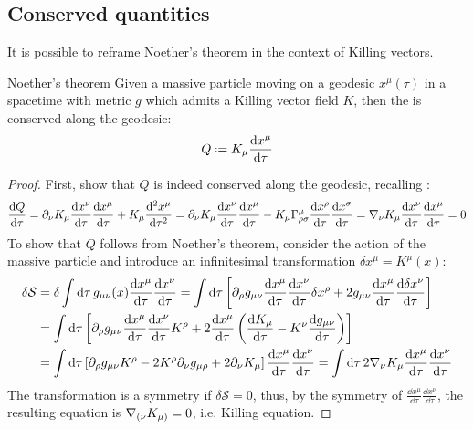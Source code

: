 \subsection{Conserved quantities}

It is possible to reframe Noether's theorem in the context of Killing vectors.

\begin{theorem}{Noether's theorem}{}
  Given a massive particle moving on a geodesic $ x^\mu(\tau) $ in a spacetime with metric $ g $ which admits a Killing vector field $ K $, then the  is conserved along the geodesic:
  \begin{equation}
    Q \defeq K_\mu \frac{\dd x^\mu}{\dd \tau}
  \end{equation}
\end{theorem}

\begin{proofbox}
  \begin{proof}
    First, show that $ Q $ is indeed conserved along the geodesic, recalling :
    \begin{equation*}
      \frac{\mathrm{d} Q}{\mathrm{d} \tau} = \partial_\nu K_\mu \frac{\mathrm{d} x^\nu}{\mathrm{d} \tau} \frac{\mathrm{d} x^\mu}{\mathrm{d} \tau} + K_\mu \frac{\mathrm{d}^2 x^\mu}{\mathrm{d} \tau^2} = \partial_\nu K_\mu \frac{\mathrm{d} x^\nu}{\mathrm{d} \tau} \frac{\mathrm{d} x^\mu}{\mathrm{d} \tau} - K_\mu \Gamma^\mu_{\rho \sigma} \frac{\mathrm{d} x^\rho}{\mathrm{d} \tau} \frac{\mathrm{d} x^\sigma}{\mathrm{d} \tau} = \nabla_\nu K_\mu \frac{\mathrm{d} x^\nu}{\mathrm{d} \tau} \frac{\mathrm{d} x^\mu}{\mathrm{d} \tau} = 0
    \end{equation*}
    To show that $ Q $ follows from Noether's theorem, consider the action of the massive particle and introduce an infinitesimal transformation $ \delta x^\mu = K^\mu (x) $:
    \begin{equation*}
      \begin{split}
        \delta \mathcal{S}
        &= \delta \int \mathrm{d} \tau\, g_{\mu \nu}(x) \frac{\mathrm{d} x^\mu}{\mathrm{d} \tau} \frac{\mathrm{d} x^\nu}{\mathrm{d} \tau} = \int \mathrm{d} \tau \left[ \partial_\rho g_{\mu \nu} \frac{\mathrm{d} x^\mu}{\mathrm{d} \tau} \frac{\mathrm{d} x^\nu}{\mathrm{d} \tau} \delta x^\rho + 2 g_{\mu \nu} \frac{\mathrm{d} x^\mu}{\mathrm{d} \tau} \frac{\mathrm{d} \delta x^\nu}{\mathrm{d} \tau} \right] \\
        &= \int \mathrm{d} \tau \left[ \partial_\rho g_{\mu \nu} \frac{\mathrm{d} x^\mu}{\mathrm{d} \tau} \frac{\mathrm{d} x^\nu}{\mathrm{d} \tau} K^\rho + 2 \frac{\mathrm{d} x^\mu}{\mathrm{d} \tau} \left( \frac{\mathrm{d} K_\mu}{\mathrm{d} \tau} - K^\nu \frac{\mathrm{d} g_{\mu \nu}}{\mathrm{d} \tau} \right) \right] \\
        &= \int \mathrm{d} \tau \left[ \partial_\rho g_{\mu \nu} K^\rho - 2 K^\rho \partial_\nu g_{\mu \rho} + 2 \partial_\nu K_\mu \right] \frac{\mathrm{d} x^\mu}{\mathrm{d} \tau} \frac{\mathrm{d} x^\nu}{\mathrm{d} \tau} = \int \mathrm{d} \tau\, 2 \nabla_\nu K_\mu \frac{\mathrm{d} x^\mu}{\mathrm{d} \tau} \frac{\mathrm{d} x^\nu}{\mathrm{d} \tau}
      \end{split}
    \end{equation*}
    The transformation is a symmetry if $ \delta \mathcal{S} = 0 $, thus, by the symmetry of $ \frac{\dd x^\mu}{\dd \tau} \frac{\dd x^\nu}{\dd \tau} $, the resulting equation is $ \nabla_{(\nu} K_{\mu)} = 0 $, i.e. Killing equation.
  \end{proof}
\end{proofbox}

